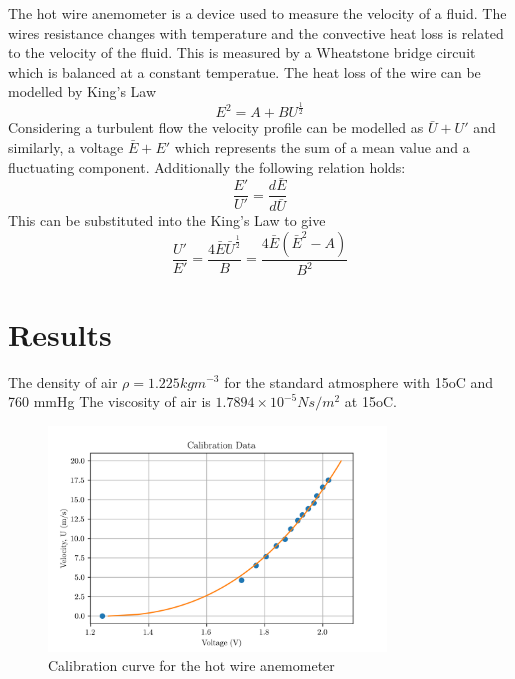 \documentclass{article}
\begin{document}
The hot wire anemometer is a device used to measure the velocity of a fluid.
The wires resistance changes with temperature and the convective heat loss is related to the velocity of the fluid.
This is measured by a Wheatstone bridge circuit which is balanced at a constant temperatue.
The heat loss of the wire can be modelled by King's Law
\begin{equation}
    E^2 = A + B U^{\frac{1}{2}}
\end{equation}
Considering a turbulent flow the velocity profile can be modelled as $\bar{U} + U'$ and similarly, a voltage $\bar{E} + E'$ which represents the sum of a mean value and a fluctuating component.
Additionally the following relation holds:
\begin{equation}
    \frac{E'}{U'} = \frac{d\bar{E}}{d\bar{U}}
\end{equation}
This can be substituted into the King's Law to give
\begin{equation}
    \frac{U'}{E'} = \frac{4\bar{E}\bar{U}^{\frac{1}{2}}}{B} = \frac{4\bar{E}(\bar{E}^2 - A)}{B^2}
\end{equation}


\section{Results}

The density of air $\rho = 1.225kgm^{-3}$ for the standard atmosphere with 15oC and 760 mmHg
The viscosity of air is $1.7894 \times 10^{-5} Ns/m^2$ at 15oC.

\begin{figure}[H]
    \centering
    \includegraphics[width=0.8\textwidth]{calibration.png}
    \caption{Calibration curve for the hot wire anemometer}
    \label{fig:calibration}
\end{figure}
\end{document}

